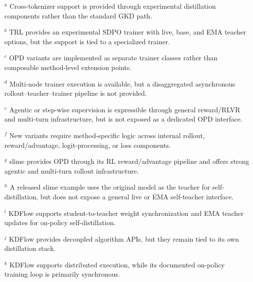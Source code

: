 \begin{table}[t]
\begin{minipage}{0.99\textwidth}
$^{a}$ Cross-tokenizer support is provided through experimental
distillation components rather than the standard GKD path.

$^{b}$ TRL provides an experimental SDPO trainer with live, base, and
EMA teacher options, but the support is tied to a specialized trainer.

$^{c}$ OPD variants are implemented as separate trainer classes rather
than composable method-level extension points.

$^{d}$ Multi-node trainer execution is available, but a disaggregated
asynchronous rollout--teacher--trainer pipeline is not provided.

$^{e}$ Agentic or step-wise supervision is expressible through general
reward/RLVR and multi-turn infrastructure, but is not exposed as a
dedicated OPD interface.

$^{f}$ New variants require method-specific logic across internal
rollout, reward/advantage, logit-processing, or loss components.

$^{g}$ slime provides OPD through its RL reward/advantage pipeline and
offers strong agentic and multi-turn rollout infrastructure.

$^{h}$ A released slime example uses the original model as the teacher
for self-distillation, but does not expose a general live or EMA
self-teacher interface.

$^{i}$ KDFlow supports student-to-teacher weight synchronization and
EMA teacher updates for on-policy self-distillation.

$^{j}$ KDFlow provides decoupled algorithm APIs, but they remain tied
to its own distillation stack.

$^{k}$ KDFlow supports distributed execution, while its documented
on-policy training loop is primarily synchronous.

\end{minipage}
\end{table}